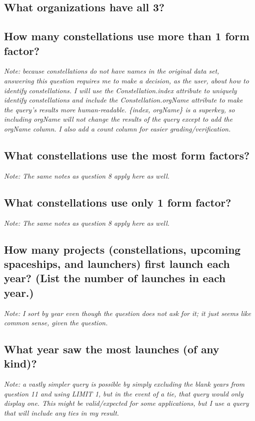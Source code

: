 \documentclass{article}
\begin{document}
    \subsection{What organizations have all 3?}
    
    \subsection{How many constellations use more than 1 form factor?}
    \textit{Note: because constellations do not have names in the original data set, answering this question requires me to make a decision, as the user, about how to identify constellations. I will use the Constellation.index attribute to uniquely identify constellations and include the Constellation.orgName attribute to make the query's results more human-readable. \{index, orgName\} is a superkey, so including orgName will not change the results of the query except to add the orgName column. I also add a count column for easier grading/verification.}
    
    \subsection{What constellations use the most form factors?}
    \textit{Note: The same notes as question 8 apply here as well.}
    
    \subsection{What constellations use only 1 form factor?}
    \textit{Note: The same notes as question 8 apply here as well.}
    
    \subsection{How many projects (constellations, upcoming spaceships, and launchers) first launch each year? (List the number of launches in each year.)}
    \textit{Note: I sort by year even though the question does not ask for it; it just seems like common sense, given the question.}
    
    \subsection{What year saw the most launches (of any kind)?}
    \textit{Note: a vastly simpler query is possible by simply excluding the blank years from question 11 and using LIMIT 1, but in the event of a tie, that query would only display one. This might be valid/expected for some applications, but I use a query that will include any ties in my result.}
    
\end{document}
